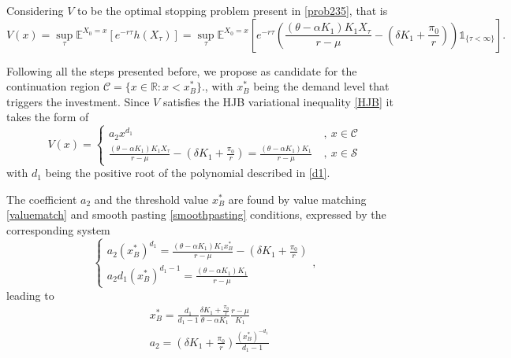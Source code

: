 Considering $V$ to be the optimal stopping problem present in \eqref{prob235}, that is
\begin{equation}
V(x)=  \sup _\tau \mathds{E}^{X_0=x} \left[ e^{-r\tau}h(X_\tau) \right] 
=\sup _\tau \mathds{E}^{X_0=x} \left[ e^{-r\tau}\left(\frac{(\theta-\alpha K_1)K_1 X_\tau}{r-\mu} - \left( \delta K_1  +\frac{\pi_0}{r}\right)  \right) \mathds{1}_{ \{\tau < \infty \} }\right].
\end{equation} 

Following all the steps presented before, we propose as candidate for the continuation region $\mathcal{C}=\{x \in \mathds{R}: x<x_B^* \}$., with $x^*_B$ being the demand level that triggers the investment. Since $V$ satisfies the HJB variational inequality \eqref{HJB} it takes the form of
\begin{equation}
V(x)=\begin{cases} a_2 x^{d_1} &\ , \ x \in \mathcal{C} \\
\frac{(\theta-\alpha K_1)K_1 X_\tau}{r-\mu} - \left( \delta K_1  +\frac{\pi_0}{r}\right)=\frac{(\theta-\alpha K_1)K_1}{r-\mu} &\ , \ x \in \mathcal{S}
\end{cases}
\end{equation}
with $d_1$ being the positive root of the polynomial described in \eqref{d1}.

The coefficient $a_2$ and the threshold value $x_B^*$ are found by value matching \eqref{valuematch} and smooth pasting \eqref{smoothpasting} conditions, expressed by the corresponding system
\begin{equation}
\begin{cases} a_2(x_B^*)^{d_1}=\frac{(\theta-\alpha K_1)K_1 x_B^*}{r-\mu} - \left( \delta K_1  +\frac{\pi_0}{r}\right) \\
a_2d_1(x_B^*)^{d_1-1}=\frac{(\theta-\alpha K_1)K_1}{r-\mu}
\end{cases},
\label{eq:sistema2}
\end{equation}
leading to
\begin{align}
&x_B^*=\frac{d_1}{d_1-1} \frac{ \delta K_1  +\frac{\pi_0}{r} }{\theta-\alpha K_1} \frac{r-\mu}{K_1} \label{2_xB} \\
&a_2=\left( \delta K_1 +\frac{\pi_0}{r}\right) \frac{(x_B^*)^{-d_1}}{d_1-1} \label{2_aB}
\end{align}


